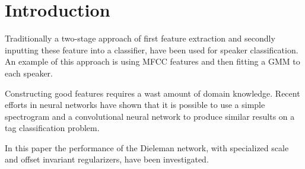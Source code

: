 \section{Introduction}

Traditionally a two-stage approach of first feature extraction and secondly inputting these feature into a classifier, have been used for speaker classification. An example of this approach is using MFCC features and then fitting a GMM to each speaker.

Constructing good features requires a wast amount of domain knowledge. Recent efforts  in neural networks\cite{dieleman} have shown that it is possible to use a simple spectrogram and a convolutional neural network to produce similar results on a tag classification problem.

In this paper the performance of the Dieleman network\cite{dieleman}, with specialized scale and offset invariant regularizers, have been investigated.
